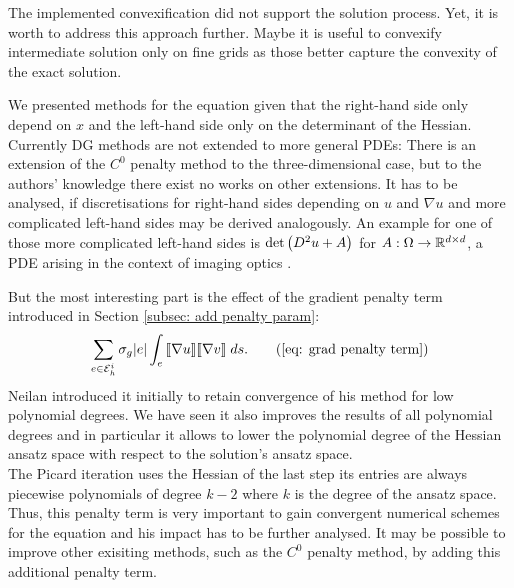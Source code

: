 The implemented convexification did not support the solution process. Yet, it is worth to address this approach further. Maybe it is useful to convexify intermediate solution only on fine grids as those better capture the convexity of the exact solution.

We presented methods for the \MA equation given that the right-hand side only depend on $x$ and the left-hand side only on the determinant of the Hessian. Currently DG methods are not extended to more general PDEs: There is an extension of the $C^0$ penalty method to the three-dimensional case\cite{BN2012}, but to the authors' knowledge there exist no works on other extensions. It has to be analysed, if  discretisations for right-hand sides depending on $u$ and $\nabla u$ and more complicated left-hand sides may be derived analogously. An example for one of those more complicated left-hand sides is $\det{\left(D^2 u +A\right)}$ for $A:\Omega \rightarrow \mathbb{R}^{d \times d}$, a PDE arising in the context of imaging optics \cite{BHP2014}.
 
But the most interesting part is the effect of the gradient penalty term introduced in Section \ref{subsec: add penalty param}:
\begin{align}
	\sum_{e \in \edgesi} \sigma_g |e |\myIntS e {\jump{ \nabla u} \jump {\nabla v}}. \tag{\ref{eq: grad penalty term}}
\end{align}
Neilan introduced it initially to retain convergence of his method for low polynomial degrees. We have seen it also improves the results of all polynomial degrees and in particular it allows to lower the polynomial degree of the Hessian ansatz space with respect to the solution's ansatz space. \\
The Picard iteration uses the Hessian of the last step its entries are always piecewise polynomials of degree $k-2$ where $k$ is the degree of the ansatz space. Thus, this penalty term is very important to gain convergent numerical schemes for the \MA equation and his impact has to be further analysed. It may be possible to improve other exisiting methods, such as the $C^0$ penalty method, by adding this additional penalty term. 
